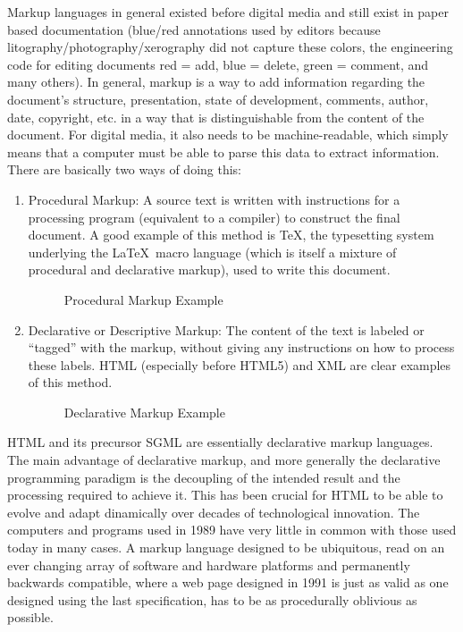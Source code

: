 Markup languages in general existed before digital media and still exist in paper based documentation (blue/red
annotations used by editors because litography/photography/xerography did not capture these colors, the engineering
code for editing documents red = add, blue = delete, green = comment, and many others). In general, markup is a way to
add information regarding the document's structure, presentation, state of development, comments, author, date,
copyright, etc. in a way that is distinguishable from the content of the document. For digital media, it also needs to
be machine-readable, which simply means that a computer must be able to parse this data to extract information. There
are basically two ways of doing this:
\begin{enumerate}
	\item Procedural Markup: A source text is written with instructions for a processing program (equivalent to a
  compiler) to construct the final document. A good example of this method is \TeX, the typesetting system underlying
  the \LaTeX\ macro language (which is itself a mixture of procedural and declarative markup), used to write this
  document.
	\begin{figure}[ht]
    \caption{Procedural Markup Example}
	\end{figure}
	\item Declarative or Descriptive Markup: The content of the text is labeled or ``tagged'' with the markup, without
  giving any instructions on how to process these labels. HTML (especially before HTML5) and XML are clear examples of
  this method.
	\begin{figure}[ht]
    \caption{Declarative Markup Example}
	\end{figure}
\end{enumerate}
HTML and its precursor SGML are essentially declarative markup languages. The main advantage of declarative markup,
and more generally the declarative programming paradigm is the decoupling of the intended result and the processing
required to achieve it. This has been crucial for HTML to be able to evolve and adapt dinamically over decades of
technological innovation. The computers and programs used in 1989 have very little in common with those used today in
many cases. A markup language designed to be ubiquitous, read on an ever changing array of software and hardware
platforms and permanently backwards compatible, where a web page designed in 1991 is just as valid as one designed
using the last specification, has to be as procedurally oblivious as possible.\\

